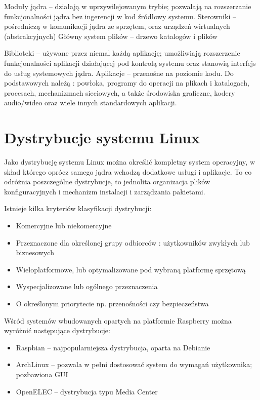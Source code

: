 Moduły jądra – działają w uprzywilejowanym trybie; pozwalają na rozszerzanie funkcjonalności jądra bez ingerencji w kod źródłowy systemu.
Sterowniki – pośredniczą w komunikacji jądra ze sprzętem, oraz urządzeń wirtualnych (abstrakcyjnych)
Główny system plików – drzewo katalogów i plików

Biblioteki – używane przez niemal każdą aplikację; umożliwiają rozszerzenie funkcjonalności aplikacji działającej pod kontrolą systemu oraz stanowią interfejs do usług systemowych jądra.
Aplikacje – przenośne na poziomie kodu. Do podstawowych należą : powłoka, programy do operacji na plikach i katalogach, procesach, mechanizmach sieciowych, a także środowiska graficzne, kodery audio/wideo oraz wiele innych standardowych aplikacji.

\section{Dystrybucje systemu Linux}

Jako dystrybucję systemu Linux można określić kompletny system operacyjny, w skład którego oprócz samego jądra wchodzą dodatkowe usługi i aplikacje. To co odróżnia poszczególne dystrybucje, to jednolita organizacja plików konfiguracyjnych i mechanizm instalacji i zarządzania pakietami.
\begin{description}
\item Istnieje kilka kryteriów klasyfikacji dystrybucji:

\begin{itemize}[noitemsep]
\item Komercyjne lub niekomercyjne
\item Przeznaczone dla określonej grupy odbiorców : użytkowników zwykłych lub biznesowych
\item Wieloplatformowe, lub optymalizowane pod wybraną platformę sprzętową
\item Wyspecjalizowane lub ogólnego przeznaczenia
\item O określonym priorytecie np. przenośności czy bezpieczeństwa
\end{itemize}
\end{description}
\begin{description}
\item Wśród systemów wbudowanych opartych na platformie Raspberry można wyróżnić następujące dystrybucje:
	\begin{itemize}[noitemsep]
	\item Raspbian – najpopularniejsza dystrybucja, oparta na Debianie
	\item ArchLinux – pozwala w pełni dostosować system do wymagań użytkownika; pozbawiona GUI
	\item OpenELEC – dystrybucja typu Media Center
	\end{itemize}
\end{description}

